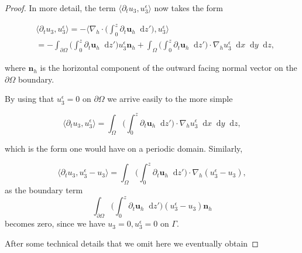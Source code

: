 \documentclass[11pt]{article}
\newcommand*\diff{\mathop{}\!\mathrm{d}}
\begin{document}
\begin{proof}
In more detail, the term $ \langle \partial_t u_3, u_3^\epsilon \rangle$ now takes the form 

\begin{equation}
  \begin{split}
    & \langle \partial_t u_3, u_3^\epsilon \rangle = - \bigg \langle \nabla_h \cdot \bigg ( \int_0^z \partial_t \mathbf{u}_h \diff z' \bigg ) , u_3^\epsilon \bigg \rangle \\
    & = - \int_{\partial \Omega} \bigg ( \int_0^z \partial_t \mathbf{u}_h \diff z' \bigg ) u_3^\epsilon \mathbf{n}_h + \int_\Omega \bigg ( \int_0^z \partial_t \mathbf{u}_h \diff z' \bigg) \cdot \nabla_h u_3^\epsilon \diff x \diff y \diff z,
  \end{split}
\end{equation}

where $\mathbf{n}_h$ is the horizontal component of the outward facing normal vector on the $\partial \Omega$ boundary.
    
By using that $u_3^\epsilon = 0$ on $\partial \Omega$ we arrive easily to the more simple
    
$$ \langle \partial_t u_3, u_3^\epsilon \rangle  = \int_\Omega \bigg ( \int_0^z \partial_t \mathbf{u}_h \diff z' \bigg) \cdot \nabla_h u_3^\epsilon \diff x \diff y \diff z,$$
     
which is the form one would have on a periodic domain. Similarly, 
     
$$ \langle \partial_t u_3, u_3^\epsilon - u_3 \rangle = \int_\Omega \bigg ( \int_0^z \partial_t \mathbf{u}_h \diff z' \bigg) \cdot \nabla_h (u_3^\epsilon - u_3),$$ as the boundary term $$\int_{\partial \Omega} \bigg ( \int_0^z \partial_t \mathbf{u}_h \diff z' \bigg ) (u_3^\epsilon - u_3) \mathbf{n}_h$$ becomes zero, since we have $u_3 = 0, u_3^\epsilon = 0$ on $\Gamma.$ 

After some technical details that we omit here we eventually obtain


\end{proof}
\end{document}
